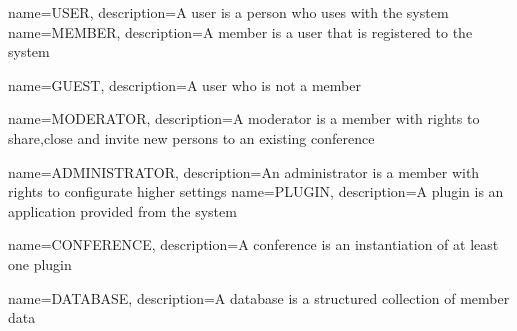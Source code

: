 {
  name=USER,
  description={A user is a person who uses with the system}
}
{
  name=MEMBER,
  description={A member is a user that is registered to the system}
}

{
  name=GUEST,
  description={A user who is not a member}
}

{
  name=MODERATOR,
  description={A moderator is a member with rights to share,close and invite new persons to an existing conference}
}

{
  name=ADMINISTRATOR,
  description={An administrator is a member with rights to configurate higher settings}
}
{
  name=PLUGIN,
  description={A plugin is an application provided from the system}
}

{
  name=CONFERENCE,
  description={A conference is an instantiation of at least one plugin}
}

{
  name=DATABASE,
  description={A database is a structured collection of member data}
}
